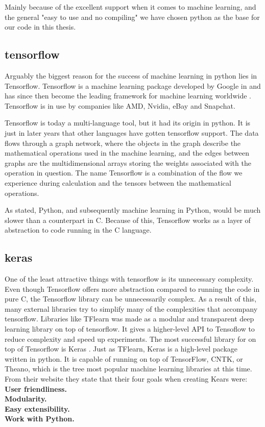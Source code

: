 Mainly because of the excellent support when it comes to machine learning, and the general "easy to use and no compiling" we have chosen python as the base for our code in this thesis. 



\subsection{tensorflow}
Arguably the biggest reason for the success of machine learning in python lies in Tensorflow. Tensorflow is a machine learning package developed by Google in  and has since then become the leading framework for machine learning worldwide .  
Tensorflow is in use by companies like AMD, Nvidia, eBay and Snapchat. 



Tensorflow is today a multi-language tool, but it had its origin in python. It is just in later years that other languages have gotten tensorflow support.  
The data flows through a graph network, where the objects in the graph describe the mathematical operations used in the machine learning, and the edges between graphs are the multidimensional arrays storing the weights associated with the operation in question. The name Tensorflow is a combination of the flow we experience during calculation and the tensors between the mathematical operations. 

As stated, Python, and subsequently machine learning in Python, would be much slower than a counterpart in C. Because of this, Tensorflow works as a layer of abstraction to code running in the C language. 
 



\subsection{keras}
One of the least attractive things with tensorflow is its unnecessary complexity.  Even though Tensorflow offers more abstraction compared to running the code in pure C, the Tensorflow library can be unnecessarily complex.
As a result of this, many external libraries try to simplify many of the complexities that accompany tensorflow. 
Libraries like TFlearn was made as a modular and transparent deep learning library on top of tensorflow. It gives a higher-level API to Tensoflow to reduce complexity and speed up experiments. 
The most successful library for on top of Tensorflow is Keras . 
Just as TFlearn, Keras is a high-level package written in python. It is capable of running on top of TensorFlow, CNTK, or Theano, which is the tree most popular machine learning libraries at this time. 
From their website they state that their four goals when creating Kears were:
\textbf{User friendliness. }\\
\textbf{Modularity. }\\
\textbf{Easy extensibility.}\\ 
\textbf{Work with Python. }\\

